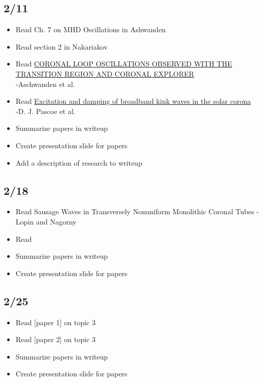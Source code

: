 \documentclass[12pt]{article}
\begin{document}
\subsection*{2/11}
\begin{itemize}
    \item Read Ch. 7 on MHD Oscillations in Ashwanden
    \item Read section 2 in Nakariakov
    \item Read \href{}{
        \textcolor{cobalt}{CORONAL LOOP OSCILLATIONS OBSERVED WITH THE TRANSITION
        REGION AND CORONAL EXPLORER}}\\
        -Aschwanden et al.
    \item Read
        \href{http://cdsads.u-strasbg.fr/abs/2015A\%26A...578A..99P}
        {\textcolor{cobalt}{Excitation and damping of broadband
        kink waves in the solar corona}}\\
        -D. J. Pascoe et al.
    \item Summarize papers in writeup
    \item Create presentation slide for papers
    \item Add a description of research to writeup
\end{itemize}

\subsection*{2/18}
\begin{itemize}
    \item Read Sausage Waves in Transversely Nonuniform Monolithic Coronal
        Tubes -Lopin and Nagorny
    \item Read
        \href{}{
        \textcolor{cobalt}{}}
    \item Summarize papers in writeup
    \item Create presentation slide for papers
\end{itemize}

\subsection*{2/25}
\begin{itemize}
    \item Read [paper 1] on topic 3
    \item Read [paper 2] on topic 3
    \item Summarize papers in writeup
    \item Create presentation slide for papers
\end{itemize}
\end{document}
